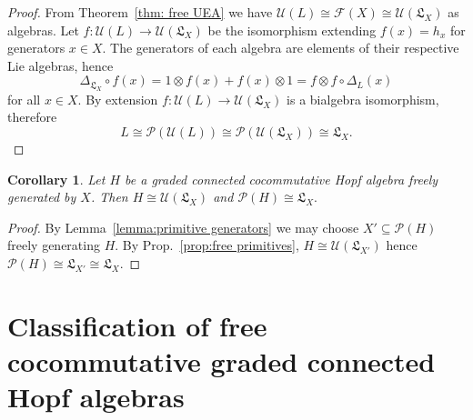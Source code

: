 \documentclass[11pt]{amsart}
\newtheorem{corollary}[theorem]{Corollary}
\theoremstyle{definition}
\numberwithin{equation}{section}
\begin{document}
\begin{proof}
%
    From Theorem~\ref{thm: free UEA} we have $\mathcal{U}(L) \cong \mathcal{F}(X) \cong \mathcal{U}(\mathfrak{L}_X)$ as algebras. Let $f:\mathcal{U}(L) \to \mathcal{U}(\mathfrak{L}_X)$ be the isomorphism extending $f(x)=h_x$ for generators $x \in X$. The generators of each algebra are elements of their respective Lie algebras, hence 
    \[
    \Delta_{\mathfrak{L}_X} \circ f(x)=1 \otimes f(x) + f(x) \otimes 1 = f \otimes f \circ \Delta_L(x) 
    \]
    for all $x \in X$. By extension $f:\mathcal{U}(L) \to \mathcal{U}(\mathfrak{L}_X)$ is a bialgebra isomorphism, therefore
    \[
    L \cong \mathcal{P}(\mathcal{U}(L)) \cong \mathcal{P}(\mathcal{U}(\mathfrak{L}_X)) \cong \mathfrak{L}_X.
    \]
\end{proof}

\begin{corollary}
    Let $H$ be a graded connected cocommutative Hopf algebra freely generated by $X$. Then $H \cong \mathcal{U}(\mathfrak{L}_X)$ and $\mathcal{P}(H)\cong \mathfrak{L}_X.$
\label{cor: free hopf primitives}
\end{corollary}
\begin{proof}
    By Lemma~\ref{lemma:primitive generators} we may choose $X'\subseteq \mathcal{P}(H)$ freely generating $H$. By Prop.~\ref{prop:free primitives}, $H\cong \mathcal{U}(\mathfrak{L}_{X'})$ hence $\mathcal{P}(H)\cong \mathfrak{L}_{X'}\cong \mathfrak{L}_X.$
\end{proof}

\section{Classification of free cocommutative graded connected Hopf algebras} 
\end{document}
